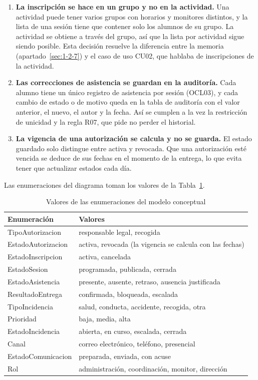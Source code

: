 \begin{enumerate}
  \item \textbf{La inscripción se hace en un grupo y no en la actividad.} Una actividad puede tener varios grupos con horarios y monitores distintos, y la lista de una sesión tiene que contener solo los alumnos de su grupo. La actividad se obtiene a través del grupo, así que la lista por actividad sigue siendo posible. Esta decisión resuelve la diferencia entre la memoria (apartado~\ref{sec:1-2-7}) y el caso de uso CU02, que hablaba de inscripciones de la actividad.
  \item \textbf{Las correcciones de asistencia se guardan en la auditoría.} Cada alumno tiene un único registro de asistencia por sesión (OCL03), y cada cambio de estado o de motivo queda en la tabla de auditoría con el valor anterior, el nuevo, el autor y la fecha. Así se cumplen a la vez la restricción de unicidad y la regla R07, que pide no perder el historial.
  \item \textbf{La vigencia de una autorización se calcula y no se guarda.} El estado guardado solo distingue entre activa y revocada. Que una autorización esté vencida se deduce de sus fechas en el momento de la entrega, lo que evita tener que actualizar estados cada día.
\end{enumerate}

Las enumeraciones del diagrama toman los valores de la Tabla~\ref{tab:dis-enumeraciones}.

\begin{table}[H]
\centering\small
\begin{tabularx}{\textwidth}{>{\hsize=0.65\hsize\raggedright\arraybackslash}X>{\hsize=1.35\hsize\raggedright\arraybackslash}X}
\toprule
\rowcolor{cabeceratabla} \textbf{Enumeración} & \textbf{Valores} \\
\midrule
TipoAutorizacion & responsable legal, recogida \\
EstadoAutorizacion & activa, revocada (la vigencia se calcula con las fechas) \\
EstadoInscripcion & activa, cancelada \\
EstadoSesion & programada, publicada, cerrada \\
EstadoAsistencia & presente, ausente, retraso, ausencia justificada \\
ResultadoEntrega & confirmada, bloqueada, escalada \\
TipoIncidencia & salud, conducta, accidente, recogida, otra \\
Prioridad & baja, media, alta \\
EstadoIncidencia & abierta, en curso, escalada, cerrada \\
Canal & correo electrónico, teléfono, presencial \\
EstadoComunicacion & preparada, enviada, con acuse \\
Rol & administración, coordinación, monitor, dirección \\
\bottomrule
\end{tabularx}
\caption{Valores de las enumeraciones del modelo conceptual}\label{tab:dis-enumeraciones}
\end{table}

